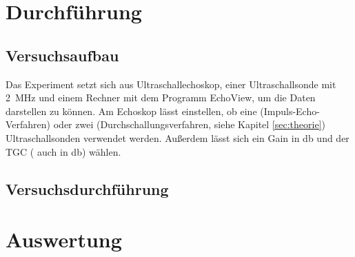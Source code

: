 \section{Durchführung}
\subsection{Versuchsaufbau}
Das Experiment setzt sich aus Ultraschallechoskop, einer Ultraschallsonde mit
\SI{2}{\mega\hertz} und einem Rechner mit dem Programm EchoView, um die Daten darstellen zu können.
Am Echoskop lässt einstellen, ob eine (Impuls-Echo-Verfahren) oder zwei (Durchschallungsverfahren, siehe Kapitel \ref{sec:theorie})
Ultraschallsonden verwendet werden. Außerdem lässt sich ein Gain in \si{\decibel} und der TGC (
auch in \si{\decibel}) wählen.
\subsection{Versuchsdurchführung}
\section{Auswertung}

